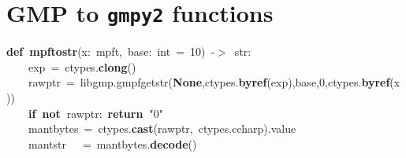 \documentclass{article}\usepackage[]{graphicx}\usepackage[dvipsnames,table]{xcolor}
\makeatletter
\newcommand{\hlnum}[1]{\textcolor[rgb]{0.686,0.059,0.569}{#1}}%
\newcommand{\hlsng}[1]{\textcolor[rgb]{0.192,0.494,0.8}{#1}}%
\newcommand{\hlopt}[1]{\textcolor[rgb]{0,0,0}{#1}}%
\newcommand{\hldef}[1]{\textcolor[rgb]{0.345,0.345,0.345}{#1}}%
\newcommand{\hlkwa}[1]{\textcolor[rgb]{0.161,0.373,0.58}{\textbf{#1}}}%
\newcommand{\hlkwb}[1]{\textcolor[rgb]{0.69,0.353,0.396}{#1}}%
\newcommand{\hlkwd}[1]{\textcolor[rgb]{0.737,0.353,0.396}{\textbf{#1}}}%
\newenvironment{kframe}{%
 \def\at@end@of@kframe{}%
 \ifinner\ifhmode%
  \def\at@end@of@kframe{\end{minipage}}%
  \begin{minipage}{\columnwidth}%
 \fi\fi%
 \def\FrameCommand##1{\hskip\@totalleftmargin \hskip-\fboxsep
 \colorbox{shadecolor}{##1}\hskip-\fboxsep
     \hskip-\linewidth \hskip-\@totalleftmargin \hskip\columnwidth}%
 \MakeFramed {\advance\hsize-\width
   \@totalleftmargin\z@ \linewidth\hsize
   \@setminipage}}%
 {\par\unskip\endMakeFramed%
 \at@end@of@kframe}
\newenvironment{knitrout}{}{} %
\makeatother
\begin{document}
\newpage
\section{GMP to {\tt gmpy2} functions}
\begin{center}
\begin{minipage}[m]{15cm}
\begin{knitrout}\small
{}\color{fgcolor}\begin{kframe}
\noindent
\ttfamily
\hldef{}\hlkwa{def\ }\hldef{}\hlkwd{mpf\textunderscore to\textunderscore str}\hldef{}\hlopt{(}\hldef{x}\hlopt{:\ }\hldef{mpf\textunderscore t}\hlopt{,\ }\hldef{base}\hlopt{:\ }\hldef{}\hlkwb{int\ }\hldef{}\hlopt{=\ }\hldef{}\hlnum{10}\hldef{}\hlopt{)\ {-}$>$\ }\hldef{}\hlkwb{str}\hldef{}\hlopt{:}\hspace*{\fill}\\
\hldef{}\hldef{\ \ \ \ }\hldef{exp\ }\hlopt{=\ }\hldef{ctypes}\hlopt{.}\hldef{}\hlkwd{c\textunderscore long}\hldef{}\hlopt{()}\hspace*{\fill}\\
\hldef{}\hldef{\ \ \ \ }\hldef{raw\textunderscore ptr\ }\hlopt{=\ }\hldef{\textunderscore libgmp}\hlnum{.\textunderscore \textunderscore }\hldef{gmpf}\hlnum{\textunderscore }\hldef{get}\hlnum{\textunderscore }\hldef{str}\hlopt{(}\hldef{}\hlkwa{None}\hldef{}\hlopt{,}\hldef{ctypes}\hlopt{.}\hldef{}\hlkwd{byref}\hldef{}\hlopt{(}\hldef{exp}\hlopt{),}\hldef{base}\hlopt{,}\hldef{}\hlnum{0}\hldef{}\hlopt{,}\hldef{ctypes}\hlopt{.}\hldef{}\hlkwd{byref}\hldef{}\hlopt{(}\hldef{x}\hlopt{))}\hspace*{\fill}\\
\hldef{}\hldef{\ \ \ \ }\hldef{}\hlkwa{if\ not\ }\hldef{raw\textunderscore ptr}\hlopt{:\ }\hldef{}\hlkwa{return\ }\hldef{}\hlsng{"0"}\hldef{}\hspace*{\fill}\\
\hldef{}\hldef{\ \ \ \ }\hldef{mant\textunderscore bytes\ }\hlopt{=\ }\hldef{ctypes}\hlopt{.}\hldef{}\hlkwd{cast}\hldef{}\hlopt{(}\hldef{raw\textunderscore ptr}\hlopt{,\ }\hldef{ctypes}\hlopt{.}\hldef{c\textunderscore char\textunderscore p}\hlopt{).}\hldef{value}\hspace*{\fill}\\
\hldef{}\hldef{\ \ \ \ }\hldef{mant\textunderscore str}\hldef{\ \ \ }\hldef{}\hlopt{=\ }\hldef{mant\textunderscore bytes}\hlopt{.}\hldef{}\hlkwd{decode}\hldef{}\hlopt{()}\hspace*{\fill}\\

\end{kframe}
\end{knitrout}
\end{minipage}
\end{center}
\end{document}
